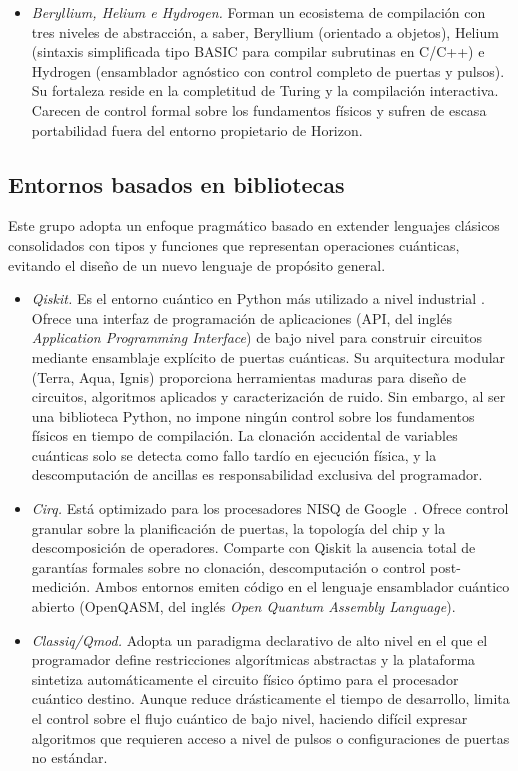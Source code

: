 \begin{itemize}
  \item \textit{Beryllium, Helium e Hydrogen.} Forman un ecosistema de compilación con tres niveles de abstracción, a saber, Beryllium (orientado a objetos), Helium (sintaxis simplificada tipo BASIC para compilar subrutinas en C/C++) e Hydrogen (ensamblador agnóstico con control completo de puertas y pulsos). Su fortaleza reside en la completitud de Turing y la compilación interactiva. Carecen de control formal sobre los fundamentos físicos y sufren de escasa portabilidad fuera del entorno propietario de Horizon.
\end{itemize}

\subsection{Entornos basados en bibliotecas}
\label{subsec:bibliotecas}

Este grupo adopta un enfoque pragmático basado en extender lenguajes clásicos consolidados con tipos y funciones que representan operaciones cuánticas, evitando el diseño de un nuevo lenguaje de propósito general.

\begin{itemize}
  \item \textit{Qiskit.} Es el entorno cuántico en Python más utilizado a nivel industrial \cite{qiskit_2024}. Ofrece una interfaz de programación de aplicaciones (API, del inglés \textit{Application Programming Interface}) de bajo nivel para construir circuitos mediante ensamblaje explícito de puertas cuánticas. Su arquitectura modular (Terra, Aqua, Ignis) proporciona herramientas maduras para diseño de circuitos, algoritmos aplicados y caracterización de ruido. Sin embargo, al ser una biblioteca Python, no impone ningún control sobre los fundamentos físicos en tiempo de compilación. La clonación accidental de variables cuánticas solo se detecta como fallo tardío en ejecución física, y la descomputación de ancillas es responsabilidad exclusiva del programador.

  \item \textit{Cirq.} Está optimizado para los procesadores NISQ de Google~\cite{cirq}. Ofrece control granular sobre la planificación de puertas, la topología del chip y la descomposición de operadores. Comparte con Qiskit la ausencia total de garantías formales sobre no clonación, descomputación o control post-medición. Ambos entornos emiten código en el lenguaje ensamblador cuántico abierto (OpenQASM, del inglés \textit{Open Quantum Assembly Language}).

  \item \textit{Classiq/Qmod.} Adopta un paradigma declarativo de alto nivel en el que el programador define restricciones algorítmicas abstractas y la plataforma sintetiza automáticamente el circuito físico óptimo para el procesador cuántico destino. Aunque reduce drásticamente el tiempo de desarrollo, limita el control sobre el flujo cuántico de bajo nivel, haciendo difícil expresar algoritmos que requieren acceso a nivel de pulsos o configuraciones de puertas no estándar.
\end{itemize}

